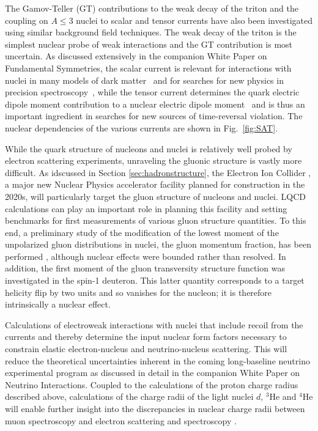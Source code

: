 The Gamov-Teller (GT) contributions to the weak decay of the triton \cite{Savage:2016kon} and the coupling on $A\le3$ nuclei to scalar and tensor currents \cite{Chang:2017eiq} have also been investigated using similar background field techniques. The weak decay of the triton is the simplest nuclear probe of weak interactions and the GT contribution is most uncertain. 
As discussed extensively in the companion White Paper on Fundamental Symmetries, the scalar current is relevant for interactions with nuclei in many models of dark matter~\cite{Undagoitia:2015gya} and for searches for new physics in precision spectroscopy~\cite{Delaunay:2016brc,Delaunay:2017dku}, while the tensor current determines 
the quark electric dipole moment contribution to a nuclear electric dipole moment~\cite{Engel:2013lsa,Yamanaka:2016umw,Chupp:2017rkp} and is thus an important ingredient in searches for new sources of time-reversal violation. 
 The nuclear dependencies of the various currents are shown in Fig.~\ref{fig:SAT}.


While the quark structure of nucleons and nuclei is relatively well probed by electron scattering experiments, unraveling the gluonic structure is vastly more difficult. As idscussed in Section \ref{sec:hadronstructure}, the Electron Ion Collider \cite{Accardi:2012qut}, a major new Nuclear Physics accelerator facility planned for construction in the 2020s, will particularly target the gluon structure of nucleons and nuclei. LQCD calculations can play an important role in planning this facility and setting benchmarks for first measurements of various gluon structure quantities. To this end, a preliminary study of the modification of the lowest moment of the unpolarized  gluon distributions in nuclei, the gluon momentum fraction, has been performed \cite{Winter:2017bfs}, although nuclear effects were bounded rather than resolved.   In addition, the first moment of the gluon transversity structure function was investigated in the spin-1 deuteron. This latter  quantity  corresponds to a target helicity flip by two units and so vanishes for the nucleon; it is therefore intrinsically a nuclear effect.



Calculations of electroweak interactions with nuclei that include recoil from the currents and thereby determine the input nuclear form factors necessary to constrain  elastic electron-nucleus and  neutrino-nucleus scattering. This will reduce the theoretical uncertainties inherent in the coming long-baseline neutrino experimental program as discussed in detail in the companion White Paper on Neutrino Interactions. Coupled to the calculations of the proton charge radius described above, calculations of the charge radii of the light nuclei $d$, $^3$He and $^4$He  will enable further insight into the discrepancies in nuclear charge radii between muon spectroscopy and electron scattering and spectroscopy \cite{}.


